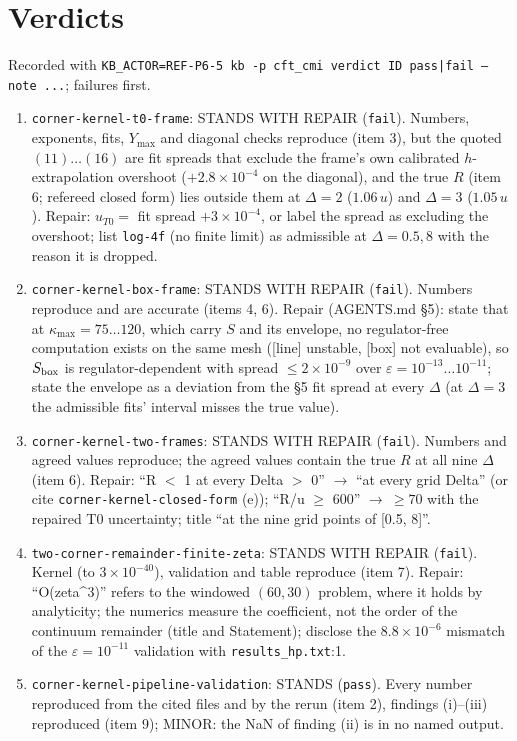 \documentclass[11pt]{article}
\begin{document}
\section{Verdicts}
Recorded with \texttt{KB\_ACTOR=REF-P6-5 kb -p cft\_cmi verdict ID pass|fail --note ...}; failures first.
\begin{enumerate}[leftmargin=*]
\item \texttt{corner-kernel-t0-frame}: STANDS WITH REPAIR (\texttt{fail}). Numbers, exponents, fits, $Y_{\max}$ and diagonal
checks reproduce (item 3), but the quoted $(11)\ldots(16)$ are fit spreads that exclude the frame's own calibrated
$h$-extrapolation overshoot ($+2.8\times10^{-4}$ on the diagonal), and the true $R$ (item 6; refereed closed form) lies outside
them at $\Delta=2$ ($1.06\,u$) and $\Delta=3$ ($1.05\,u$). Repair: $u_{T0}=$ fit spread $+3\times10^{-4}$, or label the spread as
excluding the overshoot; list \texttt{log-4f} (no finite limit) as admissible at $\Delta=0.5,8$ with the reason it is dropped.
\item \texttt{corner-kernel-box-frame}: STANDS WITH REPAIR (\texttt{fail}). Numbers reproduce and are accurate (items 4, 6).
Repair (AGENTS.md \S5): state that at $\kappa_{\max}=75\ldots120$, which carry $S$ and its envelope, no regulator-free
computation exists on the same mesh ([line] unstable, [box] not evaluable), so $S_{\rm box}$ is regulator-dependent with spread
$\le2\times10^{-9}$ over $\varepsilon=10^{-13}\ldots10^{-11}$; state the envelope as a deviation from the \S5 fit spread at every
$\Delta$ (at $\Delta=3$ the admissible fits' interval misses the true value).
\item \texttt{corner-kernel-two-frames}: STANDS WITH REPAIR (\texttt{fail}). Numbers and agreed values reproduce; the agreed
values contain the true $R$ at all nine $\Delta$ (item 6). Repair: ``R $<$ 1 at every Delta $>$ 0'' $\to$ ``at every grid Delta''
(or cite \texttt{corner-kernel-closed-form} (e)); ``R/u $\ge$ 600'' $\to\ \ge70$ with the repaired T0 uncertainty; title
``at the nine grid points of [0.5, 8]''.
\item \texttt{two-corner-remainder-finite-zeta}: STANDS WITH REPAIR (\texttt{fail}). Kernel (to $3\times10^{-40}$), validation and
table reproduce (item 7). Repair: ``O(zeta\^{}3)'' refers to the windowed $(60,30)$ problem, where it holds by analyticity; the
numerics measure the coefficient, not the order of the continuum remainder (title and Statement); disclose the
$8.8\times10^{-6}$ mismatch of the $\varepsilon=10^{-11}$ validation with \texttt{results\_hp.txt}:1.
\item \texttt{corner-kernel-pipeline-validation}: STANDS (\texttt{pass}). Every number reproduced from the cited files and by the
rerun (item 2), findings (i)--(iii) reproduced (item 9); MINOR: the NaN of finding (ii) is in no named output.
\end{enumerate}
\end{document}
